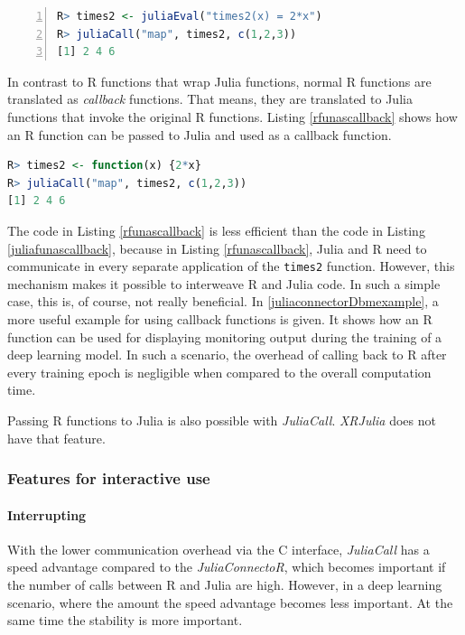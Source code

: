 \documentclass[12pt]{article}
\newcommand{\inlinecode}[1]{\texttt{#1}}
\newcommand{\apkg}[1]{\emph{#1}}
\begin{document}
\begin{lstlisting}[language=R, float =!h, caption={Passing a reference to a Julia function back to Julia},label={juliafunascallback}, numbers=left]
R> times2 <- juliaEval("times2(x) = 2*x")
R> juliaCall("map", times2, c(1,2,3))
[1] 2 4 6
\end{lstlisting}

In contrast to R functions that wrap Julia functions, normal R functions are translated as {\em callback} functions.
That means, they are translated to Julia functions that invoke the original R functions.
Listing \ref{rfunascallback} shows how an R function can be passed to Julia and used as a callback function.

\begin{lstlisting}[language=R, float =!h, caption={An R function used as a callback function}, label={rfunascallback}]
R> times2 <- function(x) {2*x}
R> juliaCall("map", times2, c(1,2,3))
[1] 2 4 6
\end{lstlisting}

The code in Listing \ref{rfunascallback} is less efficient than the code in Listing \ref{juliafunascallback}, because in Listing \ref{rfunascallback}, Julia and R need to communicate in every separate application of the \inlinecode{times2} function.
However, this mechanism makes it possible to interweave R and Julia code.
In such a simple case, this is, of course, not really beneficial.
In \ref{juliaconnectorDbmexample}, a more useful example for using callback functions is given.
It shows how an R function can be used for displaying monitoring output during the training of a deep learning model.
In such a scenario, the overhead of calling back to R after every training epoch is negligible when compared to the overall computation time.

Passing R functions to Julia is also possible with \apkg{JuliaCall}.
\apkg{XRJulia} does not have that feature.

\subsubsection{Features for interactive use}

\paragraph{Interrupting}\label{juliaconnectorinterrupting}
With the lower communication overhead via the C interface, \apkg{JuliaCall} has a speed advantage compared to the \apkg{JuliaConnectoR}, which becomes important if the number of calls between R and Julia are high.
However, in a deep learning scenario, where the amount the speed advantage becomes less important.
At the same time the stability is more important.
\end{document}
